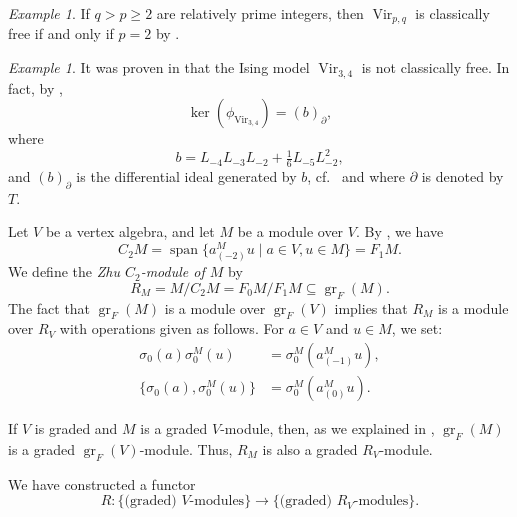 \documentclass[a4paper, 12pt, reqno]{amsart}
\theoremstyle{remark}
\newtheorem{example}[theorem]{Example}
\DeclareMathOperator{\Vir}{Vir}
\DeclareMathOperator{\gr}{gr}
\DeclareMathOperator{\vspan}{span}
\begin{document}
\begin{example}
  \label{exa:11}
  If $q > p \ge 2$ are relatively prime integers, then $\Vir_{p, q}$ is classically free if and only if $p = 2$ by \cite{van_ekeren_chiral_2021}.
\end{example}

\begin{example}
  \label{exa:12}
  It was proven in \cite{andrews_singular_2022} that the Ising model $\Vir_{3, 4}$ is not classically free.
  In fact, by \cite[Theorem 2]{andrews_singular_2022},
  \begin{equation*}
    \ker(\phi_{\Vir_{3, 4}}) = (b)_{\partial},
  \end{equation*}
  where
  \begin{equation*}
    b = L_{-4}L_{-3}L_{-2} + \tfrac{1}{6}L_{-5}L_{-2}^2,
  \end{equation*}
  and $(b)_{\partial}$ is the differential ideal generated by $b$, cf.\  and  where $\partial$ is denoted by $T$.
\end{example}

Let $V$ be a vertex algebra, and let $M$ be a module over $V$.
By , we have
\begin{equation*}
  C_2M = \vspan\{a^M_{(-2)}u \mid a \in V, u \in M\} = F_1M.
\end{equation*}
We define the \emph{Zhu $C_2$-module of $M$} by
\begin{equation*}
  R_M = M/C_2M = F_0M/F_1M \subseteq \gr_F(M).
\end{equation*}
The fact that $\gr_F(M)$ is a module over $\gr_F(V)$ implies that $R_M$ is a module over $R_V$ with operations given as follows.
For $a \in V$ and $u \in M$, we set:
\begin{align*}
  \sigma_0(a)\sigma^M_0(u) &= \sigma^M_0(a^M_{(-1)}u), \\
  \{\sigma_0(a), \sigma^M_0(u)\} &= \sigma^M_0(a^M_{(0)}u).
\end{align*}

If $V$ is graded and $M$ is a graded $V$-module, then, as we explained in , $\gr_F(M)$ is a graded $\gr_F(V)$-module.
Thus, $R_M$ is also a graded $R_V$-module.

We have constructed a functor
\begin{equation*}
  R: \{\text{(graded) $V$-modules}\} \to \{\text{(graded) $R_V$-modules}\}.
\end{equation*}
\end{document}

